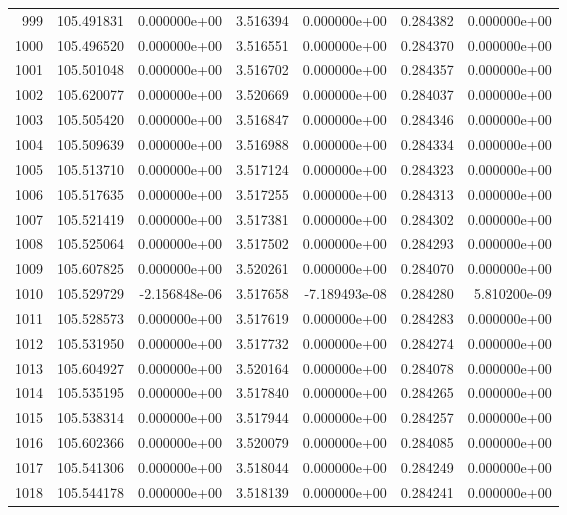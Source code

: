 \begin{tabular}{rrrrrrr}
 999 & 105.491831 &  0.000000e+00 &  3.516394 &  0.000000e+00 &    0.284382 &  0.000000e+00 \\
1000 & 105.496520 &  0.000000e+00 &  3.516551 &  0.000000e+00 &    0.284370 &  0.000000e+00 \\
1001 & 105.501048 &  0.000000e+00 &  3.516702 &  0.000000e+00 &    0.284357 &  0.000000e+00 \\
1002 & 105.620077 &  0.000000e+00 &  3.520669 &  0.000000e+00 &    0.284037 &  0.000000e+00 \\
1003 & 105.505420 &  0.000000e+00 &  3.516847 &  0.000000e+00 &    0.284346 &  0.000000e+00 \\
1004 & 105.509639 &  0.000000e+00 &  3.516988 &  0.000000e+00 &    0.284334 &  0.000000e+00 \\
1005 & 105.513710 &  0.000000e+00 &  3.517124 &  0.000000e+00 &    0.284323 &  0.000000e+00 \\
1006 & 105.517635 &  0.000000e+00 &  3.517255 &  0.000000e+00 &    0.284313 &  0.000000e+00 \\
1007 & 105.521419 &  0.000000e+00 &  3.517381 &  0.000000e+00 &    0.284302 &  0.000000e+00 \\
1008 & 105.525064 &  0.000000e+00 &  3.517502 &  0.000000e+00 &    0.284293 &  0.000000e+00 \\
1009 & 105.607825 &  0.000000e+00 &  3.520261 &  0.000000e+00 &    0.284070 &  0.000000e+00 \\
1010 & 105.529729 & -2.156848e-06 &  3.517658 & -7.189493e-08 &    0.284280 &  5.810200e-09 \\
1011 & 105.528573 &  0.000000e+00 &  3.517619 &  0.000000e+00 &    0.284283 &  0.000000e+00 \\
1012 & 105.531950 &  0.000000e+00 &  3.517732 &  0.000000e+00 &    0.284274 &  0.000000e+00 \\
1013 & 105.604927 &  0.000000e+00 &  3.520164 &  0.000000e+00 &    0.284078 &  0.000000e+00 \\
1014 & 105.535195 &  0.000000e+00 &  3.517840 &  0.000000e+00 &    0.284265 &  0.000000e+00 \\
1015 & 105.538314 &  0.000000e+00 &  3.517944 &  0.000000e+00 &    0.284257 &  0.000000e+00 \\
1016 & 105.602366 &  0.000000e+00 &  3.520079 &  0.000000e+00 &    0.284085 &  0.000000e+00 \\
1017 & 105.541306 &  0.000000e+00 &  3.518044 &  0.000000e+00 &    0.284249 &  0.000000e+00 \\
1018 & 105.544178 &  0.000000e+00 &  3.518139 &  0.000000e+00 &    0.284241 &  0.000000e+00 \\

\end{tabular}
